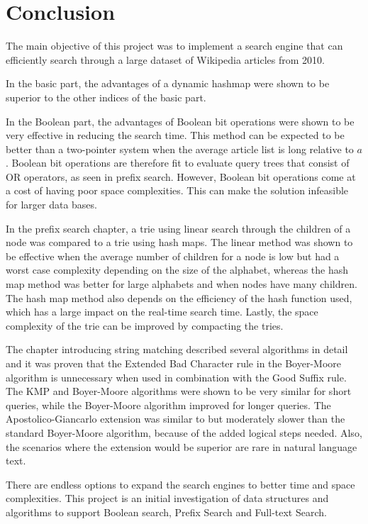 \chapter{Conclusion}

The main objective of this project was to implement a search engine that can efficiently search through a large dataset of Wikipedia articles from 2010. 

In the basic part, the advantages of a dynamic hashmap were shown to be superior to the other indices of the basic part.
 
In the Boolean part, the advantages of Boolean bit operations were shown to be very effective in reducing the search time. This method can be expected to be better than a two-pointer system when the average article list is long relative to $a$. Boolean bit operations are therefore fit to evaluate query trees that consist of OR operators, as seen in prefix search. However, Boolean bit operations come at a cost of having poor space complexities. This can make the solution infeasible for larger data bases. 

In the prefix search chapter, a trie using linear search through the children of a node was compared to a trie using hash maps. The linear method was shown to be effective when the average number of children for a node is low but had a worst case complexity depending on the size of the alphabet, whereas the hash map method was better for large alphabets and when nodes have many children. The hash map method also depends on the efficiency of the hash function used, which has a large impact on the real-time search time. Lastly, the space complexity of the trie can be improved by compacting the tries. 

The chapter introducing string matching described several algorithms in detail and it was proven that the Extended Bad Character rule in the Boyer-Moore algorithm is unnecessary when used in combination with the Good Suffix rule. The KMP and Boyer-Moore algorithms were shown to be very similar for short queries, while the Boyer-Moore algorithm improved for longer queries. The Apostolico-Giancarlo extension was similar to but moderately slower than the standard Boyer-Moore algorithm, because of the added logical steps needed. Also, the scenarios where the extension would be superior are rare in natural language text. 

There are endless options to expand the search engines to better time and space complexities. This project is an initial investigation of data structures and algorithms to support Boolean search, Prefix Search and Full-text Search. 
